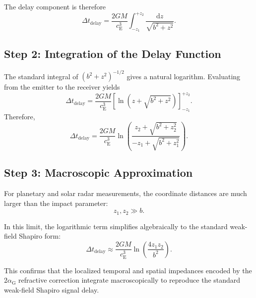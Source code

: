 The delay component is therefore
\begin{equation}
    \Delta t_{\mathrm{delay}} = \frac{2GM}{c_{\mathrm{E}}^3} \int_{-z_1}^{+z_2} \frac{\mathrm{d}z}{\sqrt{b^2+z^2}}.
\end{equation}

\subsection{Step 2: Integration of the Delay Function}
The standard integral of $(b^2+z^2)^{-1/2}$ gives a natural logarithm. Evaluating from the emitter to the receiver yields
\begin{equation}
    \Delta t_{\mathrm{delay}} = \frac{2GM}{c_{\mathrm{E}}^3} \left[ \ln \left( z+\sqrt{b^2+z^2} \right) \right]_{-z_1}^{+z_2}.
\end{equation}
Therefore,
\begin{equation}
    \Delta t_{\mathrm{delay}} = \frac{2GM}{c_{\mathrm{E}}^3} \ln \left( \frac{ z_2+\sqrt{b^2+z_2^2} }{ -z_1+\sqrt{b^2+z_1^2} } \right).
\end{equation}

\subsection{Step 3: Macroscopic Approximation}
For planetary and solar radar measurements, the coordinate distances are much larger than the impact parameter:
\begin{equation}
    z_1, z_2 \gg b.
\end{equation}

In this limit, the logarithmic term simplifies algebraically to the standard weak-field Shapiro form:
\begin{equation}
    \Delta t_{\mathrm{delay}} \approx \frac{2GM}{c_{\mathrm{E}}^3} \ln \left( \frac{4z_1z_2}{b^2} \right).
\end{equation}

This confirms that the localized temporal and spatial impedances encoded by the $2\alpha_{\mathrm{G}}$ refractive correction integrate macroscopically to reproduce the standard weak-field Shapiro signal delay.